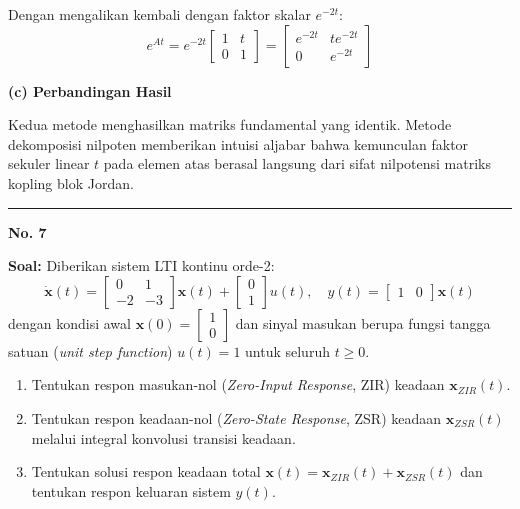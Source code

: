 \documentclass[11pt,a4paper]{article}
\begin{document}
Dengan mengalikan kembali dengan faktor skalar $e^{-2t}$:
$$e^{At} = e^{-2t} \begin{bmatrix} 1 & t \\ 0 & 1 \end{bmatrix} = \begin{bmatrix} e^{-2t} & t e^{-2t} \\ 0 & e^{-2t} \end{bmatrix}$$

\textbf{(c) Perbandingan Hasil}

Kedua metode menghasilkan matriks fundamental yang identik. Metode dekomposisi nilpoten memberikan intuisi aljabar bahwa kemunculan faktor sekuler linear $t$ pada elemen atas berasal langsung dari sifat nilpotensi matriks kopling blok Jordan.

\vspace{12pt}
\hrule
\vspace{10pt}

\textbf{\large No. 7}

\textbf{Soal:}  
Diberikan sistem LTI kontinu orde-2:
$$\dot{\mathbf{x}}(t) = \begin{bmatrix} 0 & 1 \\ -2 & -3 \end{bmatrix} \mathbf{x}(t) + \begin{bmatrix} 0 \\ 1 \end{bmatrix} u(t), \quad y(t) = \begin{bmatrix} 1 & 0 \end{bmatrix} \mathbf{x}(t)$$
dengan kondisi awal $\mathbf{x}(0) = \begin{bmatrix} 1 \\ 0 \end{bmatrix}$ dan sinyal masukan berupa fungsi tangga satuan (\textit{unit step function}) $u(t) = 1$ untuk seluruh $t \ge 0$.
\begin{enumerate}[label=(\alph*)]
    \item Tentukan respon masukan-nol (\textit{Zero-Input Response}, ZIR) keadaan $\mathbf{x}_{ZIR}(t)$.
    \item Tentukan respon keadaan-nol (\textit{Zero-State Response}, ZSR) keadaan $\mathbf{x}_{ZSR}(t)$ melalui integral konvolusi transisi keadaan.
    \item Tentukan solusi respon keadaan total $\mathbf{x}(t) = \mathbf{x}_{ZIR}(t) + \mathbf{x}_{ZSR}(t)$ dan tentukan respon keluaran sistem $y(t)$.
\end{enumerate}
\end{document}
